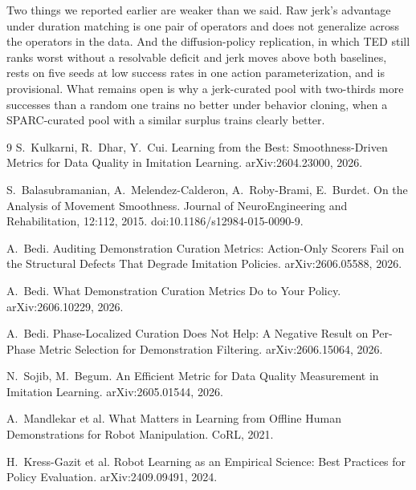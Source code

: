 \documentclass[10pt]{article}
\begin{document}
Two things we reported earlier are weaker than we said. Raw jerk's advantage
under duration matching is one pair of operators and does not generalize
across the operators in the data. And the diffusion-policy replication, in
which TED still ranks worst without a resolvable deficit and jerk moves
above both baselines, rests on five seeds at low success rates in one action
parameterization, and is provisional. What remains open is why a jerk-curated
pool with two-thirds more successes than a random one trains no better under
behavior cloning, when a SPARC-curated pool with a similar surplus trains
clearly better.


\begin{thebibliography}{9}
S.~Kulkarni, R.~Dhar, Y.~Cui.
\newblock Learning from the Best: Smoothness-Driven Metrics for Data Quality
in Imitation Learning.
\newblock arXiv:2604.23000, 2026.

S.~Balasubramanian, A.~Melendez-Calderon, A.~Roby-Brami, E.~Burdet.
\newblock On the Analysis of Movement Smoothness.
\newblock Journal of NeuroEngineering and Rehabilitation, 12:112, 2015.
\newblock doi:10.1186/s12984-015-0090-9.

A.~Bedi.
\newblock Auditing Demonstration Curation Metrics: Action-Only Scorers Fail
on the Structural Defects That Degrade Imitation Policies.
\newblock arXiv:2606.05588, 2026.

A.~Bedi.
\newblock What Demonstration Curation Metrics Do to Your Policy.
\newblock arXiv:2606.10229, 2026.

A.~Bedi.
\newblock Phase-Localized Curation Does Not Help: A Negative Result on
Per-Phase Metric Selection for Demonstration Filtering.
\newblock arXiv:2606.15064, 2026.

N.~Sojib, M.~Begum.
\newblock An Efficient Metric for Data Quality Measurement in Imitation
Learning.
\newblock arXiv:2605.01544, 2026.

A.~Mandlekar et al.
\newblock What Matters in Learning from Offline Human Demonstrations for
Robot Manipulation.
\newblock CoRL, 2021.

H.~Kress-Gazit et al.
\newblock Robot Learning as an Empirical Science: Best Practices for Policy
Evaluation.
\newblock arXiv:2409.09491, 2024.


\end{thebibliography}
\end{document}
